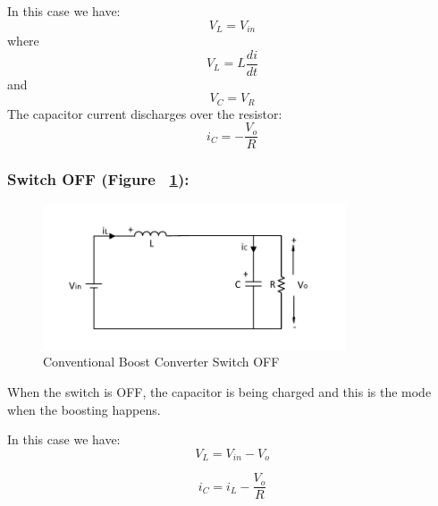 In this case we have:
\begin{equation}
	V_L = V_{in}
	\label{eq:CBC_SWON1}
\end{equation}
where
\begin{equation}
	V_L = L \frac{di}{dt}
	\label{eq:CBC_SWON2}
\end{equation}
and
\begin{equation}
	V_C = V_R
	\label{eq:CBC_SWON3}
\end{equation}
The capacitor current discharges over the resistor:
\begin{equation}
	i_C = -\frac{V_o}{R}
	\label{eq:CBC_SWON4}
\end{equation}
\subsubsection{Switch OFF (Figure ~\ref{fig:CBC_OFF}):}

\begin{figure}[H]
   \centering
   \includegraphics[width=0.8\textwidth]{figures/aConventionalBoost/ConventionalBoostConverterOFF.pdf}
    \caption{Conventional Boost Converter Switch OFF}
	\label{fig:CBC_OFF}
\end{figure}

When the switch is OFF,
the capacitor is being charged and this is the mode when the boosting happens.

In this case we have:
\begin{equation}
	V_L = V_{in} - V_o
	\label{eq:CBC_SWOFF1}
\end{equation}

\begin{equation}
	i_C = i_L -\frac{V_o}{R}
	\label{eq:CBC_SWOFF2}
\end{equation}

